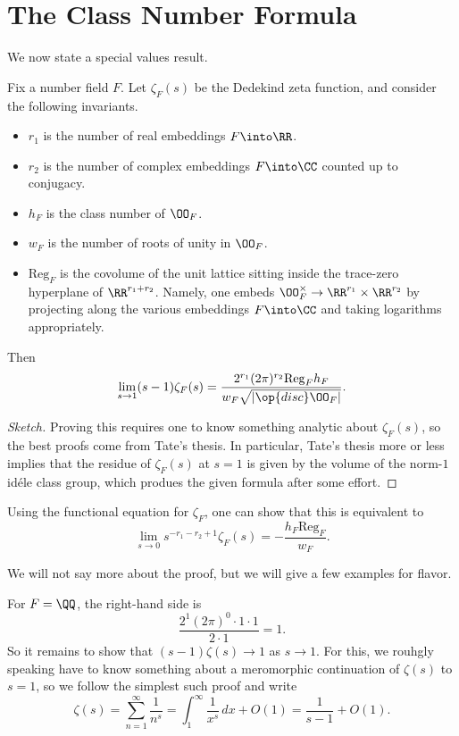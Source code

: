 \documentclass{article}
\begin{document}
\section{The Class Number Formula}
We now state a special values result.
\begin{theorem}
	Fix a number field $F$. Let $\zeta_F(s)$ be the Dedekind zeta function, and consider the following invariants.
	\begin{itemize}
		\item $r_1$ is the number of real embeddings $F\into\RR$.
		\item $r_2$ is the number of complex embeddings $F\into\CC$ counted up to conjugacy.
		\item $h_F$ is the class number of $\OO_F$.
		\item $w_F$ is the number of roots of unity in $\OO_F$.
		\item $\mathrm{Reg}_F$ is the covolume of the unit lattice sitting inside the trace-zero hyperplane of $\RR^{r_1+r_2}$. Namely, one embeds $\OO_F^\times\to\RR^{r_1}\times\RR^{r_2}$ by projecting along the various embeddings $F\into\CC$ and taking logarithms appropriately.
	\end{itemize}
	Then
	\[\lim_{s\to 1}(s-1)\zeta_F(s)=\frac{2^{r_1}(2\pi)^{r_2}\mathrm{Reg}_F h_F}{w_F\sqrt{\left|\op{disc}\OO_F\right|}}.\]
\end{theorem}
\begin{proof}[Sketch]
	Proving this requires one to know something analytic about $\zeta_F(s)$, so the best proofs come from Tate's thesis. In particular, Tate's thesis more or less implies that the residue of $\zeta_F(s)$ at $s=1$ is given by the volume of the norm-$1$ id\'ele class group, which produes the given formula after some effort.
\end{proof}
\begin{remark}
	Using the functional equation for $\zeta_F$, one can show that this is equivalent to
	\[\lim_{s\to0}s^{-r_1-r_2+1}\zeta_F(s)=-\frac{h_F\mathrm{Reg}_F}{w_F}.\]
\end{remark}
We will not say more about the proof, but we will give a few examples for flavor.
\begin{example}
	For $F=\QQ$, the right-hand side is
	\[\frac{2^1(2\pi)^0\cdot1\cdot1}{2\cdot1}=1.\]
	So it remains to show that $(s-1)\zeta(s)\to1$ as $s\to1$. For this, we rouhgly speaking have to know something about a meromorphic continuation of $\zeta(s)$ to $s=1$, so we follow the simplest such proof and write
	\[\zeta(s)=\sum_{n=1}^\infty\frac1{n^s}=\int_1^\infty\frac1{x^s}\,dx+O(1)=\frac1{s-1}+O(1).\]
\end{example}
\end{document}
